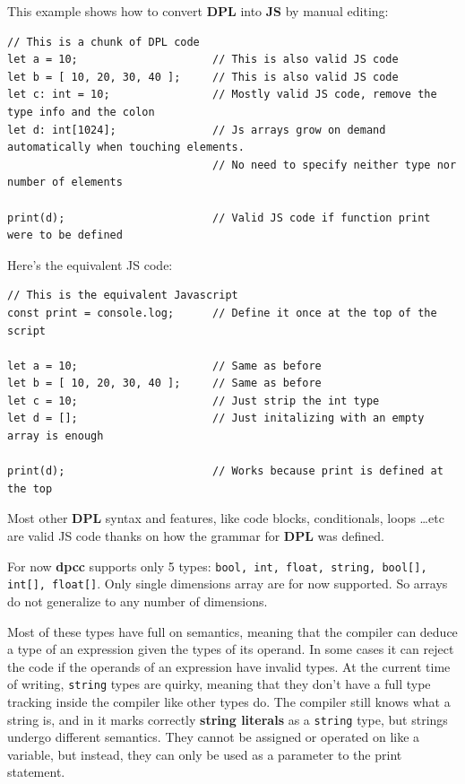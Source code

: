 \documentclass[a4paper]{article}
\begin{document}
This example shows how to convert \textbf{DPL} into \textbf{JS} by manual editing:

\begin{lstlisting}[language=DPL]
// This is a chunk of DPL code
let a = 10;                     // This is also valid JS code
let b = [ 10, 20, 30, 40 ];     // This is also valid JS code
let c: int = 10;                // Mostly valid JS code, remove the type info and the colon
let d: int[1024];               // Js arrays grow on demand automatically when touching elements.
                                // No need to specify neither type nor number of elements

print(d);                       // Valid JS code if function print were to be defined
\end{lstlisting}

Here's the equivalent JS code:

\begin{lstlisting}[language=JS]
// This is the equivalent Javascript
const print = console.log;      // Define it once at the top of the script

let a = 10;                     // Same as before
let b = [ 10, 20, 30, 40 ];     // Same as before
let c = 10;                     // Just strip the int type
let d = [];                     // Just initalizing with an empty array is enough

print(d);                       // Works because print is defined at the top
\end{lstlisting}

Most other \textbf{DPL} syntax and features, like code blocks, conditionals, loops \dots etc are valid JS code
thanks on how the grammar for \textbf{DPL} was defined.

For now \textbf{dpcc} supports only 5 types: \texttt{bool, int, float, string, bool[], int[], float[]}.
Only single dimensions array are for now supported. So arrays do not generalize to any number of dimensions.

Most of these types have full on semantics, meaning that the compiler can deduce
a type of an expression given the types of its operand. In some cases it can reject
the code if the operands of an expression have invalid types.
At the current time of writing, \texttt{string} types are quirky, meaning that
they don't have a full type tracking inside
the compiler like other types do.
The compiler still knows what a string is, and in it marks correctly \textbf{string literals} as
a \texttt{string} type, but strings undergo different semantics.
They cannot be assigned or operated on like a variable, but instead,
they can only be used as a parameter to the print statement.
\end{document}
